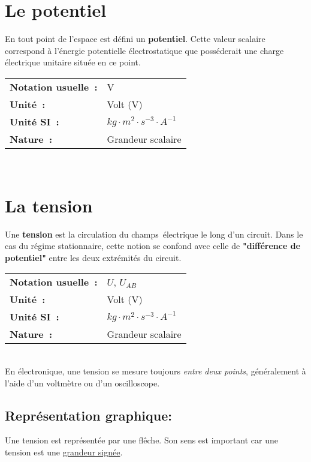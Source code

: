 \section{Le potentiel}

En tout point de l'espace est défini un \textbf{potentiel}. Cette valeur scalaire correspond à l'énergie potentielle électrostatique que posséderait une charge électrique unitaire située en ce point. \\

\begin{tabular}{ll}
\textbf{Notation usuelle~:} & V \\
	\textbf{Unité~:} & Volt (V)\\
\textbf{Unité SI~:} & ${kg} \cdot m^2 \cdot {s}^{-3} \cdot A^{-1}$ \\
\textbf{Nature~:} & Grandeur scalaire 
\end{tabular}\\

\section{La tension}

Une \textbf{tension} est la circulation du champs électrique le long d'un circuit. Dans le cas du régime stationnaire, cette notion se confond avec celle de \textbf{"différence de potentiel"} entre les deux extrémités du circuit. \\

\begin{tabular}{ll}
\textbf{Notation usuelle~:} & $U$, $U_{AB}$ \\
	\textbf{Unité~:} & Volt (V) \\
\textbf{Unité SI~:} & ${kg} \cdot m^2 \cdot {s}^{-3} \cdot A^{-1}$ \\
\textbf{Nature~:} & Grandeur scalaire \\
\end{tabular} \\

En électronique, une tension se mesure toujours \emph{entre deux points}, généralement à l'aide d'un voltmètre ou d'un oscilloscope. 

\subsection*{Représentation graphique: }

\begin{minipage}{7cm}
	 
\end{minipage}
\hspace{1cm}
\begin{minipage}{7cm}
	Une tension est représentée par une flêche. Son sens est important car une tension est une \underline{grandeur signée}. 
\end{minipage}\\

